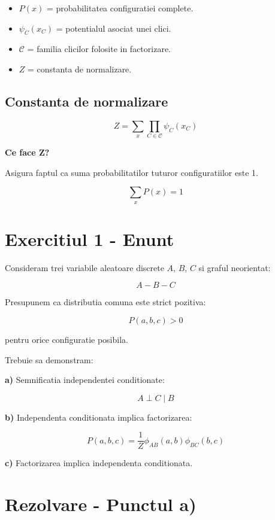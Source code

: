 \documentclass[12pt,a4paper]{article}
\begin{document}
\begin{itemize}
    \item $P(x)$ = probabilitatea configuratiei complete.
    \item $\psi_C(x_C)$ = potentialul asociat unei clici.
    \item $\mathcal{C}$ = familia clicilor folosite in factorizare.
    \item $Z$ = constanta de normalizare.
\end{itemize}

\subsection{Constanta de normalizare}

\[
\boxed{
Z=\sum_x\prod_{C\in\mathcal{C}}\psi_C(x_C)
}
\]

\textbf{Ce face Z?}

Asigura faptul ca suma probabilitatilor tuturor configuratiilor este 1.

\[
\sum_x P(x)=1
\]

\section{Exercitiul 1 - Enunt}

Consideram trei variabile aleatoare discrete $A$, $B$, $C$ si graful neorientat:

\[
\boxed{A-B-C}
\]

Presupunem ca distributia comuna este strict pozitiva:

\[
P(a,b,c)>0
\]

pentru orice configuratie posibila.

Trebuie sa demonstram:

\textbf{a)} Semnificatia independentei conditionate:

\[
A\perp C\mid B
\]

\textbf{b)} Independenta conditionata implica factorizarea:

\[
P(a,b,c)=
\frac{1}{Z}\phi_{AB}(a,b)\phi_{BC}(b,c)
\]

\textbf{c)} Factorizarea implica independenta conditionata.

\section{Rezolvare - Punctul a)}
\end{document}
